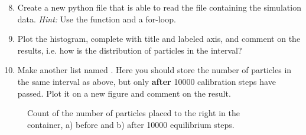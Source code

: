 \documentclass{article}
\begin{document}
\begin{enumerate}
  \setcounter{enumi}{7}

  \item Create a new python file that is able to read the file containing the simulation data.
      {\em Hint:} Use the  function and a for-loop.

  \item Plot the histogram, complete with title and labeled axis, and comment on the results, i.e. how is the     distribution of particles in the interval?

  \item Make another list named . Here you should store the number of particles in the same interval as above, but only {\bf after} 10000 calibration steps have passed.
    Plot it on a new figure and comment on the result.

\end{enumerate}

\begin{figure}[htb]
  \label{fig:partdist}
  \caption{
     Count of the number of particles placed to the right in the container, a) before and b) after 10000 equilibrium steps.
  }
\end{figure}



\end{document}
